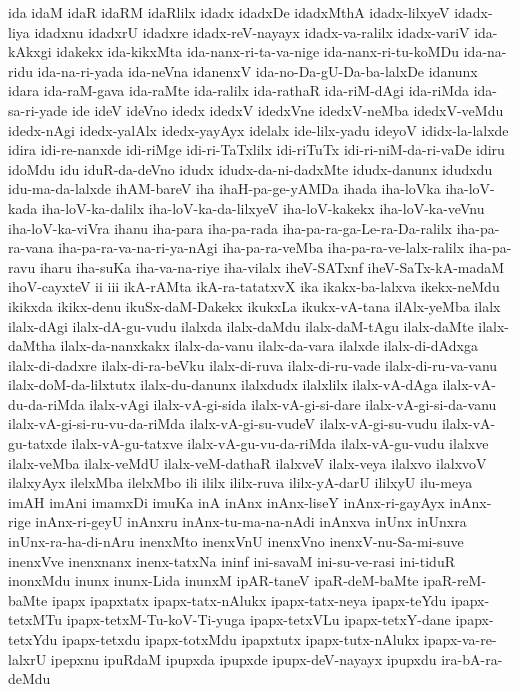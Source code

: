 {ida
idaM
idaR
idaRM
idaRlilx
idadx
idadxDe
idadxMthA
idadx-lilxyeV
idadx-liya
idadxnu
idadxrU
idadxre
idadx-reV-nayayx
idadx-va-ralilx
idadx-variV
ida-kAkxgi
idakekx
ida-kikxMta
ida-nanx-ri-ta-va-nige
ida-nanx-ri-tu-koMDu
ida-na-ridu
ida-na-ri-yada
ida-neVna
idanenxV
ida-no-Da-gU-Da-ba-lalxDe
idanunx
idara
ida-raM-gava
ida-raMte
ida-ralilx
ida-rathaR
ida-riM-dAgi
ida-riMda
ida-sa-ri-yade
ide
ideV
ideVno
idedx
idedxV
idedxVne
idedxV-neMba
idedxV-veMdu
idedx-nAgi
idedx-yalAlx
idedx-yayAyx
idelalx
ide-lilx-yadu
ideyoV
ididx-la-lalxde
idira
idi-re-nanxde
idi-riMge
idi-ri-TaTxlilx
idi-riTuTx
idi-ri-niM-da-ri-vaDe
idiru
idoMdu
idu
iduR-da-deVno
idudx
idudx-da-ni-dadxMte
idudx-danunx
idudxdu
idu-ma-da-lalxde
ihAM-bareV
iha
ihaH-pa-ge-yAMDa
ihada
iha-loVka
iha-loV-kada
iha-loV-ka-dalilx
iha-loV-ka-da-lilxyeV
iha-loV-kakekx
iha-loV-ka-veVnu
iha-loV-ka-viVra
ihanu
iha-para
iha-pa-rada
iha-pa-ra-ga-Le-ra-Da-ralilx
iha-pa-ra-vana
iha-pa-ra-va-na-ri-ya-nAgi
iha-pa-ra-veMba
iha-pa-ra-ve-lalx-ralilx
iha-pa-ravu
iharu
iha-suKa
iha-va-na-riye
iha-vilalx
iheV-SATxnf
iheV-SaTx-kA-madaM
ihoV-cayxteV
ii
iii
ikA-rAMta
ikA-ra-tatatxvX
ika
ikakx-ba-lalxva
ikekx-neMdu
ikikxda
ikikx-denu
ikuSx-daM-Dakekx
ikukxLa
ikukx-vA-tana
ilAlx-yeMba
ilalx
ilalx-dAgi
ilalx-dA-gu-vudu
ilalxda
ilalx-daMdu
ilalx-daM-tAgu
ilalx-daMte
ilalx-daMtha
ilalx-da-nanxkakx
ilalx-da-vanu
ilalx-da-vara
ilalxde
ilalx-di-dAdxga
ilalx-di-dadxre
ilalx-di-ra-beVku
ilalx-di-ruva
ilalx-di-ru-vade
ilalx-di-ru-va-vanu
ilalx-doM-da-lilxtutx
ilalx-du-danunx
ilalxdudx
ilalxlilx
ilalx-vA-dAga
ilalx-vA-du-da-riMda
ilalx-vAgi
ilalx-vA-gi-sida
ilalx-vA-gi-si-dare
ilalx-vA-gi-si-da-vanu
ilalx-vA-gi-si-ru-vu-da-riMda
ilalx-vA-gi-su-vudeV
ilalx-vA-gi-su-vudu
ilalx-vA-gu-tatxde
ilalx-vA-gu-tatxve
ilalx-vA-gu-vu-da-riMda
ilalx-vA-gu-vudu
ilalxve
ilalx-veMba
ilalx-veMdU
ilalx-veM-dathaR
ilalxveV
ilalx-veya
ilalxvo
ilalxvoV
ilalxyAyx
ilelxMba
ilelxMbo
ili
ililx
ililx-ruva
ililx-yA-darU
ililxyU
ilu-meya
imAH
imAni
imamxDi
imuKa
inA
inAnx
inAnx-liseY
inAnx-ri-gayAyx
inAnx-rige
inAnx-ri-geyU
inAnxru
inAnx-tu-ma-na-nAdi
inAnxva
inUnx
inUnxra
inUnx-ra-ha-di-nAru
inenxMto
inenxVnU
inenxVno
inenxV-nu-Sa-mi-suve
inenxVve
inenxnanx
inenx-tatxNa
ininf
ini-savaM
ini-su-ve-rasi
ini-tiduR
inonxMdu
inunx
inunx-Lida
inunxM
ipAR-taneV
ipaR-deM-baMte
ipaR-reM-baMte
ipapx
ipapxtatx
ipapx-tatx-nAlukx
ipapx-tatx-neya
ipapx-teYdu
ipapx-tetxMTu
ipapx-tetxM-Tu-koV-Ti-yuga
ipapx-tetxVLu
ipapx-tetxY-dane
ipapx-tetxYdu
ipapx-tetxdu
ipapx-totxMdu
ipapxtutx
ipapx-tutx-nAlukx
ipapx-va-re-lalxrU
ipepxnu
ipuRdaM
ipupxda
ipupxde
ipupx-deV-nayayx
ipupxdu
ira-bA-ra-deMdu
}
